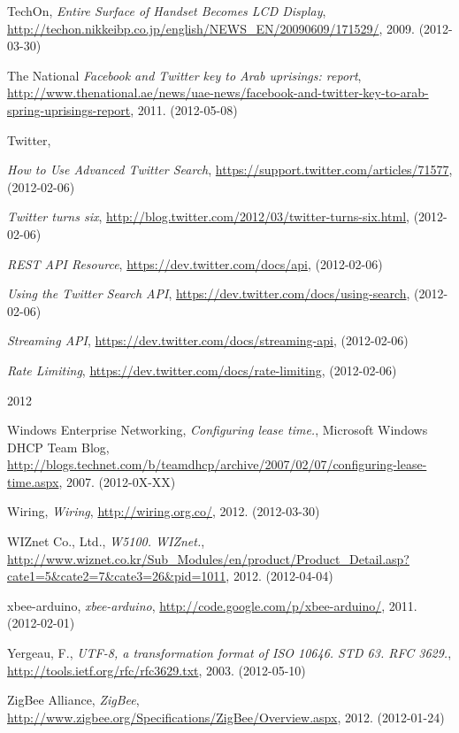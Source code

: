 \documentclass[a4paper,11pt]{article}
\newcounter{qcounter}
\begin{document}
\begin{thebibliography}{9}
\label{techon}
    TechOn,
    \emph{Entire Surface of Handset Becomes LCD Display},
    \url{http://techon.nikkeibp.co.jp/english/NEWS_EN/20090609/171529/},
    2009. (2012-03-30)

\label{national}
    The National
    \emph{Facebook and Twitter key to Arab uprisings: report},
    \url{http://www.thenational.ae/news/uae-news/facebook-and-twitter-key-to-arab-spring-uprisings-report},
    2011. (2012-05-08)

\label{twitter}
    Twitter,
    \begin{list}{[]}{}
    \item \emph{How to Use Advanced Twitter Search}, \url{https://support.twitter.com/articles/71577}, (2012-02-06)
    \item \emph{Twitter turns six}, \url{http://blog.twitter.com/2012/03/twitter-turns-six.html}, (2012-02-06)
    \item \emph{REST API Resource}, \url{https://dev.twitter.com/docs/api}, (2012-02-06)
    \item \emph{Using the Twitter Search API}, \url{https://dev.twitter.com/docs/using-search}, (2012-02-06)
    \item \emph{Streaming API}, \url{https://dev.twitter.com/docs/streaming-api}, (2012-02-06)
    \item \emph{Rate Limiting}, \url{https://dev.twitter.com/docs/rate-limiting}, (2012-02-06)
    \end{list}
    2012

\label{wen}
    Windows Enterprise Networking,
    \emph{Configuring lease time.},
    Microsoft Windows DHCP Team Blog,
    \url{http://blogs.technet.com/b/teamdhcp/archive/2007/02/07/configuring-lease-time.aspx},
    2007. (2012-0X-XX)

\label{wiring}
    Wiring,
    \emph{Wiring},
    \url{http://wiring.org.co/},
    2012. (2012-03-30)

\label{wiznet}
    WIZnet Co., Ltd.,
    \emph{W5100.  WIZnet.},
    \url{http://www.wiznet.co.kr/Sub_Modules/en/product/Product_Detail.asp?cate1=5&cate2=7&cate3=26&pid=1011},
    2012. (2012-04-04)

\label{xbeearduino}
xbee-arduino,
\emph{xbee-arduino},
\url{http://code.google.com/p/xbee-arduino/},
2011. (2012-02-01)

\label{yergeau}
\label{rfc2277}
Yergeau, F.,
\emph{UTF-8, a transformation format of ISO 10646. STD 63. RFC 3629.},
\url{http://tools.ietf.org/rfc/rfc3629.txt},
2003. (2012-05-10)

\label{zigbee}
    ZigBee Alliance,
    \emph{ZigBee},
    \url{http://www.zigbee.org/Specifications/ZigBee/Overview.aspx},
    2012. (2012-01-24)

\end{thebibliography}
\end{document}
